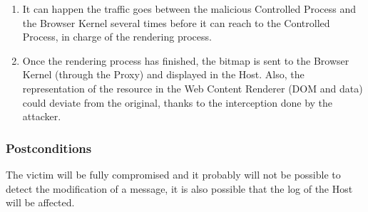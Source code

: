 \documentclass{sig-alternate-05-2015}
\begin{document}
\begin{enumerate}
        \item It can happen the traffic goes between the malicious Controlled Process and the Browser Kernel several times before it can reach to the Controlled Process, in charge of the rendering process.
        \item Once the rendering process has finished, the bitmap is sent to the Browser Kernel (through the Proxy) and displayed in the Host. Also, the representation of the resource in the Web Content Renderer (DOM and data) could deviate from the original, thanks to the interception done by the attacker.

      \end{enumerate}
  \subsubsection*{Postconditions} The victim will be fully compromised and it probably will not be possible to detect the modification of a message, it is also possible that the log of the Host will be affected.
\end{document}

